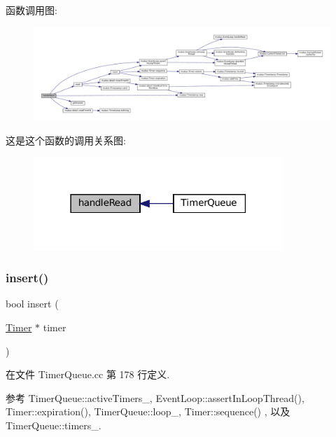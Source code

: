 函数调用图\+:
\nopagebreak
\begin{figure}[H]
\begin{center}
\leavevmode
\includegraphics[width=350pt]{classmuduo_1_1TimerQueue_a231ec0ec0313193a59b3f1326328ae50_cgraph}
\end{center}
\end{figure}
这是这个函数的调用关系图\+:
\nopagebreak
\begin{figure}[H]
\begin{center}
\leavevmode
\includegraphics[width=267pt]{classmuduo_1_1TimerQueue_a231ec0ec0313193a59b3f1326328ae50_icgraph}
\end{center}
\end{figure}
\mbox{\label{classmuduo_1_1TimerQueue_ac4bdfea344ee2a30857d2eabadfef399}} 
\subsubsection{\texorpdfstring{insert()}{insert()}}
{\footnotesize\ttfamily bool insert (\begin{DoxyParamCaption}\item[{\hyperlink{classmuduo_1_1Timer}{Timer} $\ast$}]{timer }\end{DoxyParamCaption})\hspace{0.3cm}{\ttfamily [private]}}



在文件 Timer\+Queue.\+cc 第 178 行定义.



参考 Timer\+Queue\+::active\+Timers\+\_\+, Event\+Loop\+::assert\+In\+Loop\+Thread(), Timer\+::expiration(), Timer\+Queue\+::loop\+\_\+, Timer\+::sequence() , 以及 Timer\+Queue\+::timers\+\_\+.



